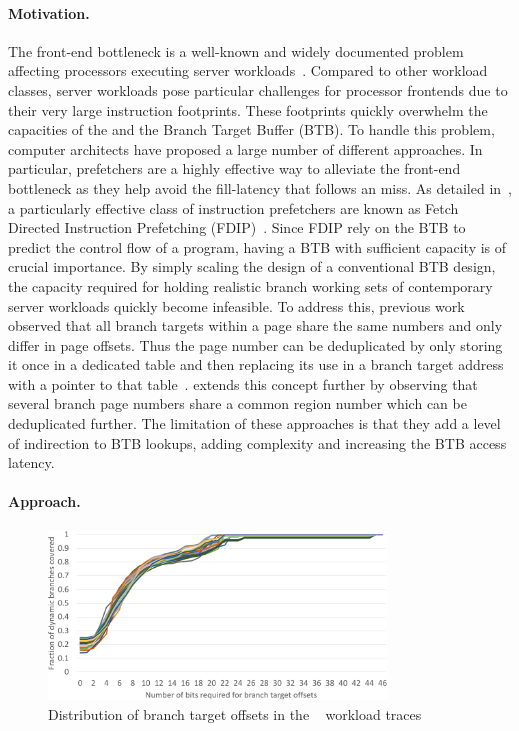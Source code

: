 \documentclass[../main.tex]{subfiles}
\begin{document}
\begin{refsection}
\paragraph{Motivation.}
The front-end bottleneck is a well-known and widely documented problem
affecting processors executing server
workloads~\cite{ailamaki99_dbmss_moder_proces,ferdman12_clear_cloud,kanev15_profil,ayers19_asmdb}. Compared
to other workload classes, server workloads pose particular challenges
for processor frontends due to their very large instruction
footprints. These footprints quickly overwhelm the capacities of the
 and the Branch Target Buffer (BTB). To handle
this problem, computer architects have proposed a large number of
different approaches. In particular,  prefetchers
are a highly effective way to alleviate the front-end bottleneck as
they help avoid the fill-latency that follows an 
miss.  As detailed in~, a particularly
effective class of instruction prefetchers are known as Fetch Directed
Instruction Prefetching
(FDIP)~\cite{reinman99_fetch_direc_instr_prefet}. Since FDIP rely on
the BTB to predict the control flow of a program, having a BTB with
sufficient capacity is of crucial importance. By simply scaling the
design of a conventional BTB design, the capacity required for holding
realistic branch working sets of contemporary server workloads quickly
become infeasible. To address this, previous work observed that all
branch targets within a page share the same numbers and only differ in
page offsets. Thus the page number can be deduplicated by only storing
it once in a dedicated table and then replacing its use in a branch
target address with a pointer to that
table~\cite{seznec96_dont_use_page_number_point_it}. \textcite{soundararajan21_pdede}
extends this concept further by observing that several branch page
numbers share a common region number which can be deduplicated
further. The limitation of these approaches is that they add a level
of indirection to BTB lookups, adding complexity and increasing the
BTB access latency.


\paragraph{Approach.}

\begin{figure}[ht]
  \centering
  \includegraphics[width=0.8\textwidth]{figures/offset_distribution.pdf}
  \caption{\label{fig:offset-distr} Distribution of branch target offsets in the ~\cite{ipc1} workload traces}
\end{figure}


\end{refsection}
\end{document}
